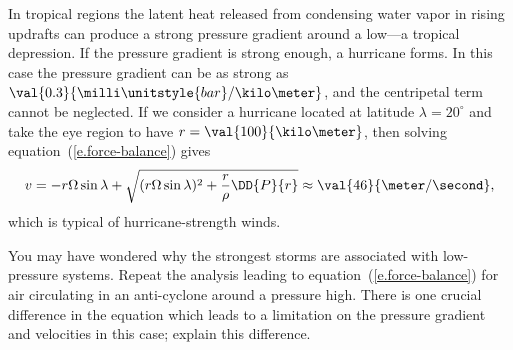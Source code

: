 In tropical regions the latent heat released from condensing water vapor in rising updrafts can produce a strong pressure gradient around a low---a tropical depression. If the pressure gradient is strong enough, a hurricane forms. In this case the pressure gradient can be as strong as $\val{0.3}{\milli\unitstyle{bar}/\kilo\meter}$, and the centripetal term cannot be neglected.
If we consider a hurricane located at  latitude $\lambda=20^{\circ}$ and take the eye region to have $r = \val{100}{\kilo\meter}$, then solving equation~(\ref{e.force-balance}) gives
\[
	v = -r\Omega\sin\lambda + \sqrt{(r\Omega\sin\lambda)^{2}+\frac{r}{\rho}\DD{P}{r}}\approx \val{46}{\meter/\second},
\]
which is typical of hurricane-strength winds.

\begin{exercisebox}
You may have wondered why the strongest storms are associated with low-pressure systems. Repeat the analysis leading to equation~(\ref{e.force-balance}) for air circulating in an anti-cyclone around a pressure high. There is one crucial difference in the equation which leads to a limitation on the pressure gradient and velocities in this case; explain this difference.
\end{exercisebox}
